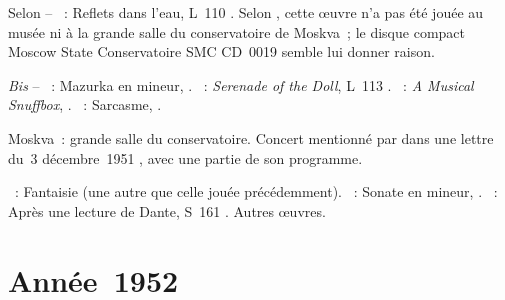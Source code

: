 \begin{description}
 Selon \ASofronitsky{} -- \textsc{\Debussy{}}~: Reflets dans l'eau, L~110
 .
 Selon \NKalinenko{}, cette œuvre n'a pas été jouée au musée \Scriabine{}
 ni à la grande salle du conservatoire de Moskva~; le disque compact Moscow
 State Conservatoire SMC CD~0019 semble lui donner raison.

 \emph{Bis} -- \textsc{\Chopin{}}~: Mazurka en \kE mineur, 
 .
 \textsc{\Debussy{}}~: \emph{Serenade of the Doll}, L~113 .
 \textsc{\Liadov{}}~: \emph{A Musical Snuffbox}, .
 \textsc{\Prokofiev{}}~: Sarcasme,  .
 \item[\DateWithWeekDay{1951-12-16}]
 Moskva~: grande salle du conservatoire.
 Concert mentionné par \VSofronitsky{} dans une lettre du~3 décembre~1951
 \citep[voir][p.~172]{Nekrasova08}, avec une partie de son programme.

 \textsc{\Mozart{}}~: Fantaisie (une autre que celle jouée précédemment).
 \textsc{\Beethoven{}}~: Sonate  en \kC \Sharp mineur, 
 .
 \textsc{\Liszt{}}~: Après une lecture de Dante, S~161 .
 Autres œuvres.
\end{description}

\section{Année~1952}

